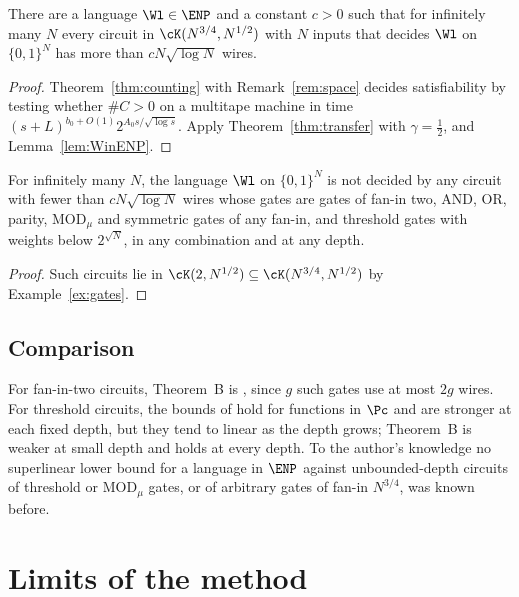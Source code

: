 \begin{theorem}[Theorem B]\label{thm:lower}
There are a language $\Wl\in\ENP$ and a constant $c>0$ such that for infinitely
many $N$ every circuit in $\cK(N^{3/4},N^{1/2})$ with $N$ inputs that decides
$\Wl$ on $\{0,1\}^N$ has more than $cN\sqrt{\log N}$ wires.
\end{theorem}

\begin{proof}
Theorem~\ref{thm:counting} with Remark~\ref{rem:space} decides satisfiability
by testing whether $\#C>0$ on a multitape machine in time
$(s+L)^{b_0+O(1)}2^{A_0s/\sqrt{\log s}}$. Apply Theorem~\ref{thm:transfer} with
$\gamma=\tfrac12$, and Lemma~\ref{lem:WinENP}.
\end{proof}

\begin{corollary}\label{cor:lowerclasses}
For infinitely many $N$, the language $\Wl$ on $\{0,1\}^N$ is not decided by any
circuit with fewer than $cN\sqrt{\log N}$ wires whose gates are gates of fan-in
two, AND, OR, parity, $\mathrm{MOD}_\mu$ and symmetric gates of any fan-in, and
threshold gates with weights below $2^{\sqrt N}$, in any combination and at any
depth.
\end{corollary}

\begin{proof}
Such circuits lie in $\cK(2,N^{1/2})\subseteq\cK(N^{3/4},N^{1/2})$ by
Example~\ref{ex:gates}.
\end{proof}

\subsection{Comparison}
For fan-in-two circuits, Theorem~B is \cite[Corollary 1.4]{OAI26}, since $g$
such gates use at most $2g$ wires. For threshold circuits, the bounds of
\cite{IPS97,KW16,CSS18} hold for functions in $\Pc$ and are stronger at each
fixed depth, but they tend to linear as the depth grows; Theorem~B is weaker at
small depth and holds at every depth. To the author's knowledge no superlinear
lower bound for a language in $\ENP$ against unbounded-depth circuits of
threshold or $\mathrm{MOD}_\mu$ gates, or of arbitrary gates of fan-in
$N^{3/4}$, was known before.

\section{Limits of the method}\label{sec:limits}

